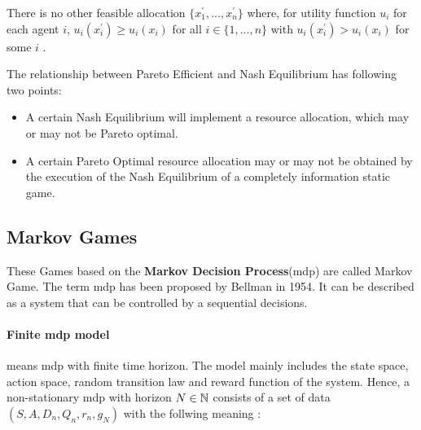 \begin{proposition}
There is no other feasible allocation $\{x_{1}^{\prime},...,x_{n}^{\prime}\}$ where, for 
utility function $u_i$ for each agent $i$, $u_{i}(x_{i}^{\prime}) \geqslant u_{i}(x_{i})$ for all $i \in \{1,...,n\}$ with $u_{i}(x_{i}^{\prime})>u_{i}(x_{i})$ for some $i$ \parencite{Whinston1989}.
\end{proposition}

The relationship between Pareto Efficient and Nash Equilibrium has following two points:

\begin{itemize}
\item A certain Nash Equilibrium will implement a resource allocation, which may or may not be Pareto optimal.
\item A certain Pareto Optimal resource allocation may or may not be obtained by the execution of the Nash Equilibrium of a completely information static game.
\end{itemize}

\subsection{Markov Games} \label{background-game-theory-markov-game}
These Games based on the \textbf{Markov Decision Process}(\gls{mdp}) are called Markov Game. The term \gls{mdp} has been proposed by Bellman in 1954\parencite{Bellma1954}. It can be described as a system that can be controlled by a sequential decisions.

\paragraph{Finite \gls{mdp} model}
means \gls{mdp} with finite time horizon. The model mainly includes the state space, action space, random transition law and reward function of the system. Hence, a non-stationary \gls{mdp} with horizon $N \in \mathbb{N}$ consists of a set of data $(S, A, D_n, Q_n, r_n, g_N)$ with the follwing meaning \parencite{Bäuerle2010}:

